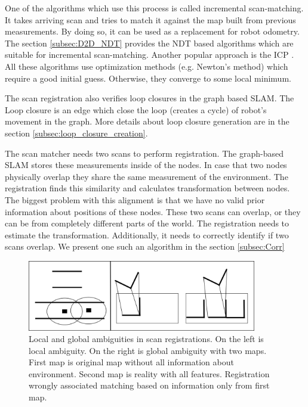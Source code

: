 One of the algorithms which use this process is called incremental scan-matching. It takes arriving scan and tries to match it against the map built from previous measurements. By doing so, it can be used as a replacement for robot odometry. The section \ref{subsec:D2D_NDT} provides the \gls{NDT} based algorithms which are suitable for incremental scan-matching. Another popular approach is the \gls{ICP} \cite{LuMilios}. All these algorithms use optimization methods (e.g. Newton's method) which require a good initial guess. Otherwise, they converge to some local minimum. 

The scan registration also verifies loop closures in the graph based \gls{SLAM}. The Loop closure is an edge which close the loop (creates a cycle) of robot's movement in the graph. More details about loop closure generation are in the section \ref{subsec:loop_closure_creation}. 

The scan matcher needs two scans to perform registration. The graph-based \gls{SLAM} stores these measurements inside of the nodes. In case that two nodes physically overlap they share the same measurement of the environment. The registration finds this similarity and calculates transformation between nodes. The biggest problem with this alignment is that we have no valid prior information about positions of these nodes. These two scans can overlap, or they can be from completely different parts of the world. The registration needs to estimate the transformation. Additionally, it needs to correctly identify if two scans overlap. We present one such an algorithm in the section \ref{subsec:Corr}    

\begin{figure}
\centering
\includegraphics[width=100mm]{../img/ambi.png} 	
\caption{Local and global ambiguities in scan registrations. On the left is local ambiguity. On the right is global ambiguity with two maps. First map is original map without all information about environment. Second map is reality with all features. Registration wrongly associated matching based on information only from first map.} \label{fig:ambig}

\end{figure}


